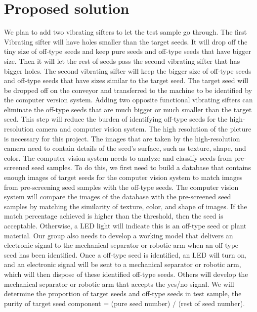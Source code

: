 \documentclass[letter,draftclsnoffot, onecolumn]{IEEEtran}
\begin{document}
\section{Proposed solution}
We plan to add two vibrating sifters to let the test sample go through. The first Vibrating sifter will have holes smaller than the target seeds. It will drop off the tiny size of off-type seeds and keep pure seeds and off-type seeds that have bigger size. Then it will let the rest of seeds pass the second vibrating sifter that has bigger holes. The second vibrating sifter will keep the bigger size of off-type seeds and off-type seeds that have sizes similar to the target seed. The target seed will be dropped off on the conveyor and transferred to the machine to be identified by the computer version system. Adding two opposite functional vibrating sifters can eliminate the off-type seeds that are much bigger or much smaller than the target seed. This step will reduce the burden of identifying off-type seeds for the high-resolution camera and computer vision system. The high resolution of the picture is necessary for this project. The images that are taken by the high-resolution camera need to contain details of the seed’s surface, such as texture, shape, and color. The computer vision system needs to analyze and classify seeds from pre-screened seed samples. To do this, we first need to build a database that contains enough images of target seeds for the computer vision system to match images from pre-screening seed samples with the off-type seeds. The computer vision system will compare the images of the database with the pre-screened seed samples by matching the similarity of texture, color, and shape of images. If the match percentage achieved is higher than the threshold, then the seed is acceptable. Otherwise, a LED light will indicate this is an off-type seed or plant material. Our group also needs to develop a working model that delivers an electronic signal to the mechanical separator or robotic arm when an off-type seed has been identified. Once a off-type seed is identified, an LED will turn on, and an electronic signal will be sent to a mechanical separator or robotic arm, which will then dispose of these identified off-type seeds. Others will develop the mechanical separator or robotic arm that accepts the yes/no signal. We will determine the proportion of target seeds and off-type seeds in test sample, the purity of target seed component = (pure seed number) / (rest of seed number).\pagebreak
\end{document}
